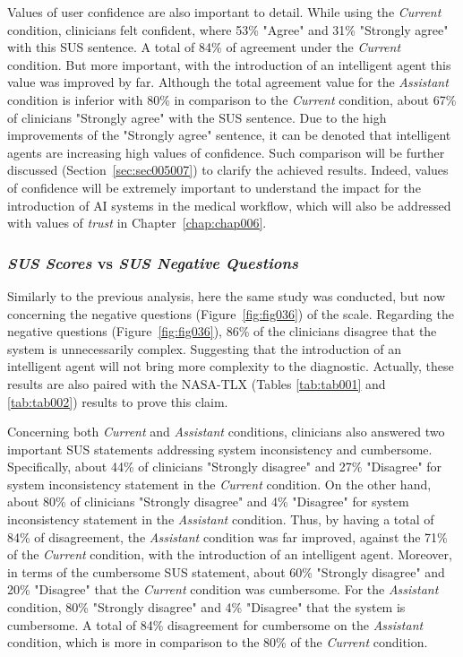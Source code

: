 Values of user confidence are also important to detail.
While using the {\it Current} condition, clinicians felt confident, where 53\% "Agree" and 31\% "Strongly agree" with this \ac{SUS} sentence.
A total of 84\% of agreement under the {\it Current} condition.
But more important, with the introduction of an intelligent agent this value was improved by far.
Although the total agreement value for the {\it Assistant} condition is inferior with 80\% in comparison to the {\it Current} condition, about 67\% of clinicians "Strongly agree" with the \ac{SUS} sentence.
Due to the high improvements of the "Strongly agree" sentence, it can be denoted that intelligent agents are increasing high values of confidence.
Such comparison will be further discussed (Section~\ref{sec:sec005007}) to clarify the achieved results.
Indeed, values of confidence will be extremely important to understand the impact for the introduction of \ac{AI} systems in the medical workflow, which will also be addressed with values of {\it trust} in Chapter~\ref{chap:chap006}.

\subsubsection{{\it SUS Scores} vs {\it SUS Negative Questions}}
\label{sec:sec005006001002}

Similarly to the previous analysis, here the same study was conducted, but now concerning the negative questions (Figure~\ref{fig:fig036}) of the scale.
Regarding the negative questions (Figure~\ref{fig:fig036}), 86\% of the clinicians disagree that the system is unnecessarily complex.
Suggesting that the introduction of an intelligent agent will not bring more complexity to the diagnostic.
Actually, these results are also paired with the \ac{NASA-TLX} (Tables \ref{tab:tab001} and \ref{tab:tab002}) results to prove this claim.

Concerning both {\it Current} and {\it Assistant} conditions, clinicians also answered two important \ac{SUS} statements addressing system inconsistency and cumbersome.
Specifically, about 44\% of clinicians "Strongly disagree" and 27\% "Disagree" for system inconsistency statement in the {\it Current} condition.
On the other hand, about 80\% of clinicians "Strongly disagree" and 4\% "Disagree" for system inconsistency statement in the {\it Assistant} condition.
Thus, by having a total of 84\% of disagreement, the {\it Assistant} condition was far improved, against the 71\% of the {\it Current} condition, with the introduction of an intelligent agent.
Moreover, in terms of the cumbersome \ac{SUS} statement, about 60\% "Strongly disagree" and 20\% "Disagree" that the {\it Current} condition was cumbersome.
For the {\it Assistant} condition, 80\% "Strongly disagree" and 4\% "Disagree" that the system is cumbersome.
A total of 84\% disagreement for cumbersome on the {\it Assistant} condition, which is more in comparison to the 80\% of the {\it Current} condition.

